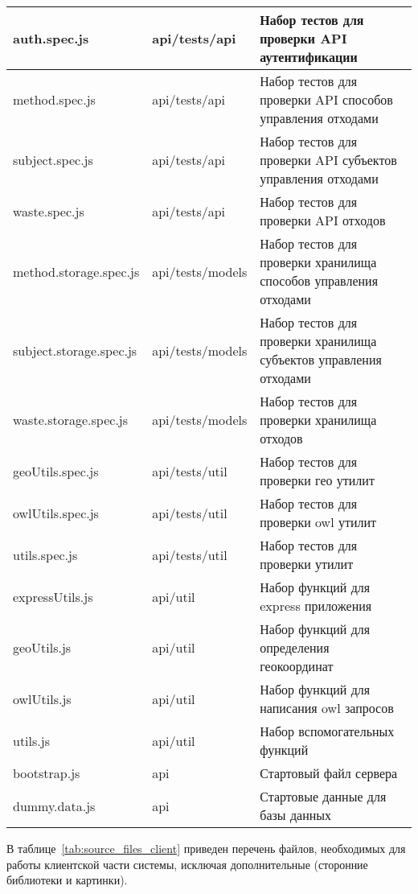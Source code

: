 \documentclass[a4paper]{G2-105}
\begin{document}
\begin{longtable}[l]{|p{5cm}|p{3cm}|p{6.7cm}|}
\hline
auth.spec.js & api/tests/api & Набор тестов для проверки API аутентификации \tabularnewline
\hline
method.spec.js & api/tests/api & Набор тестов для проверки API способов управления отходами \tabularnewline
\hline
subject.spec.js & api/tests/api & Набор тестов для проверки API субъектов управления отходами \tabularnewline
\hline
waste.spec.js & api/tests/api & Набор тестов для проверки API отходов \tabularnewline
\hline
method.storage.spec.js & api/tests/models & Набор тестов для проверки хранилища способов управления отходами \tabularnewline
\hline
subject.storage.spec.js & api/tests/models & Набор тестов для проверки хранилища субъектов управления отходами \tabularnewline
\hline
waste.storage.spec.js & api/tests/models & Набор тестов для проверки хранилища отходов \tabularnewline
\hline
geoUtils.spec.js & api/tests/util & Набор тестов для проверки гео утилит \tabularnewline
\hline
owlUtils.spec.js & api/tests/util & Набор тестов для проверки owl утилит \tabularnewline
\hline
utils.spec.js & api/tests/util & Набор тестов для проверки утилит \tabularnewline
\hline
expressUtils.js & api/util & Набор функций для express приложения \tabularnewline
\hline
geoUtils.js & api/util & Набор функций для определения геокоординат \tabularnewline
\hline
owlUtils.js & api/util & Набор функций для написания owl запросов \tabularnewline
\hline
utils.js & api/util & Набор вспомогательных функций \tabularnewline
\hline
bootstrap.js & api & Стартовый файл сервера \tabularnewline
\hline
dummy.data.js & api & Стартовые данные для базы данных \tabularnewline
\end{longtable}

В таблице~\ref{tab:source_files_client} приведен перечень файлов, необходимых для работы клиентской части системы, исключая дополнительные (сторонние библиотеки и картинки).
\end{document}
